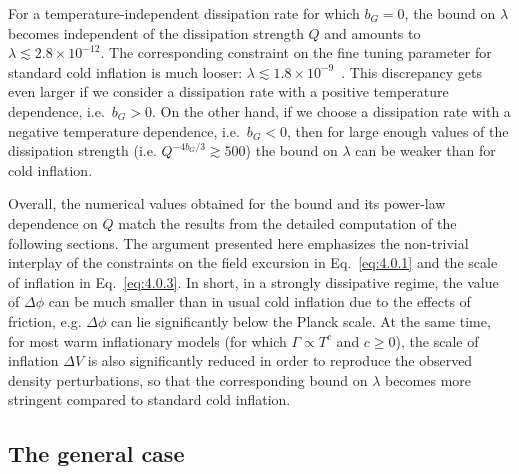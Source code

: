 \documentclass[aps,prd,twocolumn,amssymb,amsmath,floatfix,nofootinbib,superscriptaddress,preprintnumbers]{revtex4-1}
\begin{document}
For a temperature-independent dissipation rate for which $b_G=0$, the bound on $\lambda$ becomes independent of the dissipation strength $Q$ and amounts to $\lambda\lesssim 2.8\times 10^{-12}$. The corresponding constraint on the fine tuning parameter for standard cold inflation is much looser: $\lambda\lesssim 1.8\times 10^{-9}$~\cite{Adams:1990pn}. This discrepancy gets even larger if we consider a dissipation rate with a positive temperature dependence, i.e.\ $b_G>0$. 
On the other hand, if we choose a dissipation rate with a negative temperature dependence, i.e.\ $b_G<0$, then for large enough values of the dissipation strength (i.e. $Q^{-4 b_G/3}\gtrsim 500$) the bound on $\lambda$ can be weaker than for cold inflation.

Overall, the numerical values obtained for the bound and its power-law dependence on $Q$ match the results from the detailed computation of the following sections. The argument presented here emphasizes the non-trivial interplay of the constraints on the field excursion in Eq.~\ref{eq:4.0.1} and the scale of inflation in Eq.~\ref{eq:4.0.3}. In short, in a strongly dissipative regime, the value of $\Delta\phi$ can be much smaller than in usual cold inflation due to the effects of friction, e.g. $\Delta\phi$ can lie significantly below the Planck scale. At the same time, for most warm inflationary models (for which $\Gamma\propto T^c$ and $c\geq 0$), the scale of inflation $\Delta V$ is also significantly reduced in order to reproduce the observed density perturbations, so that the corresponding bound on $\lambda$ becomes more stringent compared to standard cold inflation.

\subsection{The general case \label{sec:4.1}}
\end{document}
